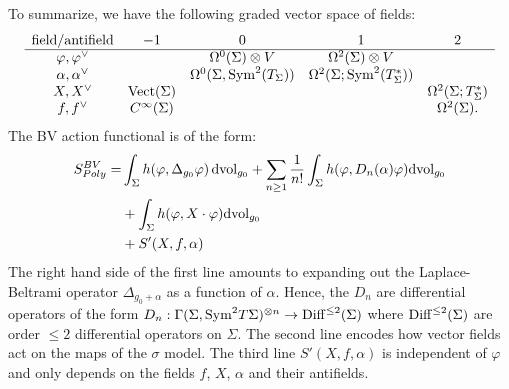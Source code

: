 To summarize, we have the following graded vector space of fields:
\[
\begin{array}{ccccc}
\text{field/antifield} & -1 &0 & 1 & 2\\
\hline
\varphi, \varphi^\vee & & \Omega^{0}(\Sigma) \otimes V & \Omega^2(\Sigma) \otimes V & \\
\alpha, \alpha^\vee & &  \Omega^0(\Sigma,{\rm Sym}^2(T_\Sigma)) & \Omega^2(\Sigma ; {\rm Sym}^{2}(T^*_\Sigma)) & \\
X, X^\vee & {\rm Vect}(\Sigma) & & & \Omega^2(\Sigma ; T^*_\Sigma)\\
f, f^\vee & C^\infty(\Sigma) &&& \Omega^2(\Sigma) .
\end{array}
\]
The BV action functional is of the form:
\begin{align}\label{polyakov bv}
S^{BV}_{Poly} = 
& \int_\Sigma h(\varphi, \Delta_{g_0} \varphi)\, {\rm dvol}_{g_0} + \sum_{n \geq 1} \frac{1}{n!} \int_{\Sigma} h(\varphi, D_n(\alpha) \varphi) {\rm dvol}_{g_0} \\
& +  \int_{\Sigma} h(\varphi, X \cdot \varphi) {\rm dvol}_{g_0} \\
& +  S'(X, f, \alpha) 
\end{align}
The right hand side of the first line amounts to expanding out the Laplace-Beltrami operator $\Delta_{g_0 + \alpha}$ as a function of $\alpha$.
Hence, the $D_n$ are differential operators of the form 
$D_n : \Gamma(\Sigma , {\rm Sym}^2 T\Sigma)^{\otimes n} \to {\rm Diff}^{\leq 2} (\Sigma)$ 
where ${\rm Diff}^{\leq 2}(\Sigma)$ are order $\leq 2$ differential operators on $\Sigma$.
The second line encodes how vector fields act on the maps of the $\sigma$ model.
The third line $S'(X, f, \alpha)$ is independent of $\varphi$
and only depends on the fields $f$, $X$, $\alpha$ and their antifields.

